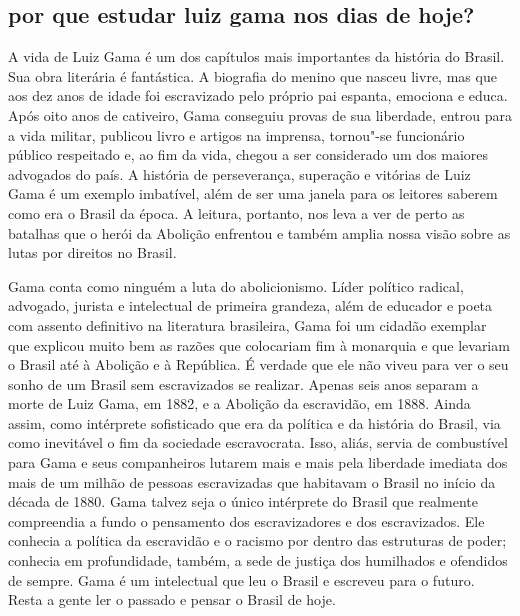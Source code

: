 \subsection{por que estudar luiz gama nos dias de hoje?}

A vida de Luiz Gama é um dos capítulos mais importantes da história do
Brasil. Sua obra literária é fantástica. A biografia do menino que
nasceu livre, mas que aos dez anos de idade foi escravizado pelo próprio
pai espanta, emociona e educa. Após oito anos de cativeiro, Gama
conseguiu provas de sua liberdade, entrou para a vida militar, publicou
livro e artigos na imprensa, tornou"-se funcionário público respeitado e,
ao fim da vida, chegou a ser considerado um dos maiores advogados do
país. A história de perseverança, superação e vitórias de Luiz Gama é um
exemplo imbatível, além de ser uma janela para os leitores saberem como
era o Brasil da época. A leitura, portanto, nos leva a ver de perto as
batalhas que o herói da Abolição enfrentou e também amplia nossa visão
sobre as lutas por direitos no Brasil.

Gama conta como ninguém a luta do abolicionismo. Líder político radical,
advogado, jurista e intelectual de primeira grandeza, além de educador e
poeta com assento definitivo na literatura brasileira, Gama foi um
cidadão exemplar que explicou muito bem as razões que colocariam fim à
monarquia e que levariam o Brasil até à Abolição e à República. É
verdade que ele não viveu para ver o seu sonho de um Brasil sem
escravizados se realizar. Apenas seis anos separam a morte de Luiz Gama,
em 1882, e a Abolição da escravidão, em 1888. Ainda assim, como
intérprete sofisticado que era da política e da história do Brasil, via
como inevitável o fim da sociedade escravocrata. Isso, aliás, servia de
combustível para Gama e seus companheiros lutarem mais e mais pela
liberdade imediata dos mais de um milhão de pessoas escravizadas que
habitavam o Brasil no início da década de 1880. Gama talvez seja o único
intérprete do Brasil que realmente compreendia a fundo o pensamento dos
escravizadores e dos escravizados. Ele conhecia a política da escravidão
e o racismo por dentro das estruturas de poder; conhecia em
profundidade, também, a sede de justiça dos humilhados e ofendidos de
sempre. Gama é um intelectual que leu o Brasil e escreveu para o futuro.
Resta a gente ler o passado e pensar o Brasil de hoje.


